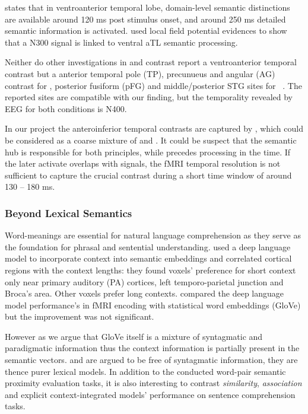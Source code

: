 \textcite{lambon-ralphNeuralComputationalBases2017} states that in ventroanterior temporal lobe, domain-level semantic distinctions are available around 120 ms post stimulus onset, and around 250 ms detailed semantic information is activated. \textcite{shimotakeDirectExplorationRole2015} used local field potential evidences to show that a N300 signal is linked to ventral aTL semantic processing. 

Neither do other investigations in \similarity and \association contrast report a ventroanterior temporal contrast but a anterior temporal pole (TP), precunueus and angular (AG) contrast for \similarity, posterior fusiform (pFG) and middle/posterior STG sites for \association~\parencite{kutasBrainPotentialsReading1984, frankWordPredictabilitySemantic2017}. The reported sites are compatible with our finding, but the temporality revealed by EEG for both conditions is N400. 

In our project the anteroinferior temporal contrasts are captured by , which could be considered as a coarse mixture of \similarity and \association. It could be suspect that the semantic hub is responsible for both principles, while \similarity precedes \association processing in the time. If the later \association activate overlaps with \similarity signals, the fMRI temporal resolution is not sufficient to capture the crucial contrast during a short time window of around 130 -- 180 ms.

\subsubsection{Beyond Lexical Semantics}

Word-meanings are essential for natural language comprehension as they serve as the foundation for phrasal and sentential understanding. \textcite{jainIncorporatingContextLanguage2018} used a deep language model to incorporate context into semantic embeddings and correlated cortical regions with the context lengths: they found voxels' preference for short context only near primary auditory (PA) cortices, left temporo-parietal junction and Broca's area. Other voxels prefer long contexts. \textcite{verdierEncodageActiviteNeuronale2018} compared the deep language model performance's in fMRI encoding with statistical word embeddings (GloVe) but the improvement was not significant.

However as we argue that GloVe itself is a mixture of syntagmatic and paradigmatic information thus the context information is partially present in the semantic vectors.  and  are argued to be free of syntagmatic information, they are thence purer lexical models. In addition to the conducted word-pair semantic proximity evaluation tasks, it is also interesting to contrast \emph{similarity}, \emph{association} and explicit context-integrated models' performance on sentence comprehension tasks.

